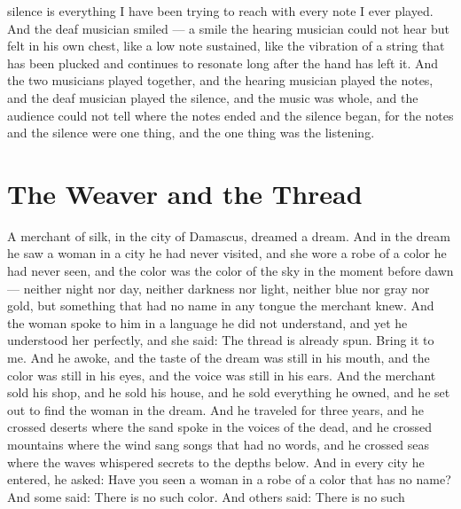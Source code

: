 \documentclass[12pt,openany]{book}
\begin{document}
silence is everything I have been trying to reach with every note I ever played. And the deaf musician smiled --- a smile the hearing musician could not hear but felt in his own chest, like a low note sustained, like the vibration of a string that has been plucked and continues to resonate long after the hand has left it. And the two musicians played together, and the hearing musician played the notes, and the deaf musician played the silence, and the music was whole, and the audience could not tell where the notes ended and the silence began, for the notes and the silence were one thing, and the one thing was the listening.


\chapter{The Weaver and the Thread}

A merchant of silk, in the city of Damascus, dreamed a dream. And in the dream he saw a woman in a city he had never visited, and she wore a robe of a color he had never seen, and the color was the color of the sky in the moment before dawn --- neither night nor day, neither darkness nor light, neither blue nor gray nor gold, but something that had no name in any tongue the merchant knew. And the woman spoke to him in a language he did not understand, and yet he understood her perfectly, and she said: The thread is already spun. Bring it to me. And he awoke, and the taste of the dream was still in his mouth, and the color was still in his eyes, and the voice was still in his ears. And the merchant sold his shop, and he sold his house, and he sold everything he owned, and he set out to find the woman in the dream. And he traveled for three years, and he crossed deserts where the sand spoke in the voices of the dead, and he crossed mountains where the wind sang songs that had no words, and he crossed seas where the waves whispered secrets to the depths below. And in every city he entered, he asked: Have you seen a woman in a robe of a color that has no name? And some said: There is no such color. And others said: There is no such
\end{document}
